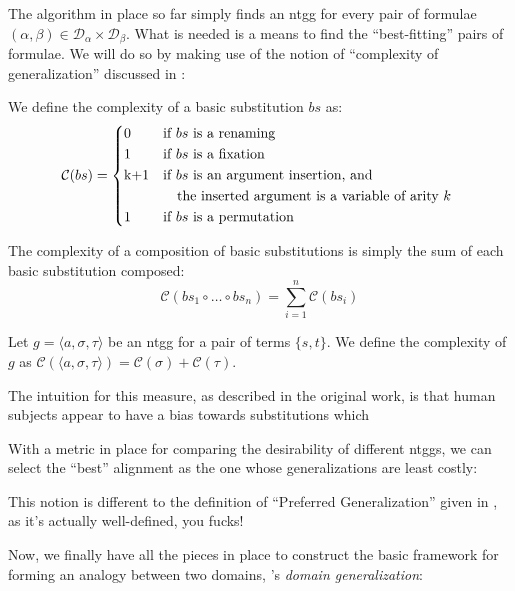 \documentclass[12pt,a4paper]{article}
\begin{document}
The algorithm in place so far simply finds an ntgg for every pair of
formulae $(\alpha, \beta) \in \mathcal{D}_\alpha \times
\mathcal{D}_\beta$. What is needed is a means to find the
``best-fitting'' pairs of formulae. We will do so by making use of the
notion of ``complexity of generalization'' discussed in
\cite{Schmidt-2014}:

\begin{definition}
    We define the complexity of a basic substitution $bs$ as:
    \begin{equation}
    \mathcal{C}(bs) =
    \begin{cases*}
      $0$ & if $bs$ is a renaming \\
      $1$ & if $bs$ is a fixation \\
      $k+1$ & if $bs$ is an argument insertion, and\\
      & \quad the inserted argument is a variable of arity $k$ \\
      $1$ & if $bs$ is a permutation \\
    \end{cases*}
  \end{equation}
  
  The complexity of a composition of basic substitutions is simply the sum of each basic substitution composed:
  $$\mathcal{C}(bs_1 \circ \dots \circ bs_n) = \displaystyle \sum_{i= 1}^n \mathcal{C}(bs_i) $$
\end{definition}

\begin{definition}
    Let $g = \langle a, \sigma, \tau \rangle$ be an ntgg for a pair of terms $\{s,t\}$. We define the complexity of $g$ as $\mathcal{C}( \langle a, \sigma, \tau \rangle) = \mathcal{C}(\sigma) + \mathcal{C}(\tau)$. 
\end{definition}

The intuition for this measure, as described in the original work, is that human subjects appear to have a bias towards substitutions which 


With a metric in place for comparing the desirability of different ntggs, we can select the ``best'' alignment as the one whose generalizations are least costly:



This notion is different to the definition of ``Preferred Generalization'' given in \cite{Schmidt-2014}, as it's actually well-defined, you fucks!

Now, we finally have all the pieces in place to construct the basic framework for forming an analogy between two domains, \cite{Schmidt-2014}'s \textit{domain generalization}:
\end{document}
